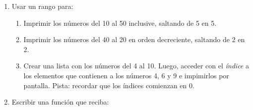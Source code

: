 \documentclass[
  letterpaper,
  DIV=11,
  numbers=noendperiod]{scrreprt}
\providecommand{\tightlist}{%
  \setlength{\itemsep}{0pt}\setlength{\parskip}{0pt}}\usepackage{longtable,booktabs,array}
\begin{document}
\begin{enumerate}
\def\labelenumi{\arabic{enumi}.}
\item
  Usar un rango para:

  \begin{enumerate}
  \def\labelenumii{\alph{enumii}.}
  \tightlist
  \item
    Imprimir los números del 10 al 50 inclusive, saltando de 5 en 5.
  \item
    Imprimir los números del 40 al 20 en orden decreciente, saltando de
    2 en 2.
  \item
    Crear una lista con los números del 4 al 10. Luego, acceder con el
    \emph{índice} a los elementos que contienen a los números 4, 6 y 9 e
    impimirlos por pantalla. Pista: recordar que los índices comienzan
    en 0.
  \end{enumerate}
\item
  Escribir una función que reciba:


\end{enumerate}
\end{document}
